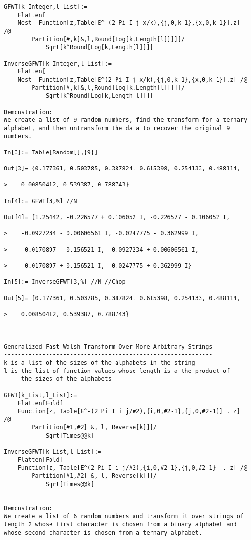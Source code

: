 \begin{verbatim}
GFWT[k_Integer,l_List]:=
	Flatten[
	Nest[ Function[z,Table[E^-(2 Pi I j x/k),{j,0,k-1},{x,0,k-1}].z] /@
		Partition[#,k]&,l,Round[Log[k,Length[l]]]]]/
			Sqrt[k^Round[Log[k,Length[l]]]]

InverseGFWT[k_Integer,l_List]:=
	Flatten[
	Nest[ Function[z,Table[E^(2 Pi I j x/k),{j,0,k-1},{x,0,k-1}].z] /@
		Partition[#,k]&,l,Round[Log[k,Length[l]]]]]/
			Sqrt[k^Round[Log[k,Length[l]]]]

Demonstration:
We create a list of 9 random numbers, find the transform for a ternary
alphabet, and then untransform the data to recover the original 9 numbers.

In[3]:= Table[Random[],{9}]

Out[3]= {0.177361, 0.503785, 0.387824, 0.615398, 0.254133, 0.488114, 
 
>    0.00850412, 0.539387, 0.788743}

In[4]:= GFWT[3,%] //N    

Out[4]= {1.25442, -0.226577 + 0.106052 I, -0.226577 - 0.106052 I, 
 
>    -0.0927234 - 0.00606561 I, -0.0247775 - 0.362999 I, 
 
>    -0.0170897 - 0.156521 I, -0.0927234 + 0.00606561 I, 
 
>    -0.0170897 + 0.156521 I, -0.0247775 + 0.362999 I}

In[5]:= InverseGFWT[3,%] //N //Chop

Out[5]= {0.177361, 0.503785, 0.387824, 0.615398, 0.254133, 0.488114, 
 
>    0.00850412, 0.539387, 0.788743}



Generalized Fast Walsh Transform Over More Arbitrary Strings
------------------------------------------------------------
k is a list of the sizes of the alphabets in the string
l is the list of function values whose length is a the product of 
     the sizes of the alphabets

GFWT[k_List,l_List]:=
	Flatten[Fold[
	Function[z, Table[E^-(2 Pi I i j/#2),{i,0,#2-1},{j,0,#2-1}] . z] /@
		Partition[#1,#2] &, l, Reverse[k]]]/
			Sqrt[Times@@k]

InverseGFWT[k_List,l_List]:=
	Flatten[Fold[
	Function[z, Table[E^(2 Pi I i j/#2),{i,0,#2-1},{j,0,#2-1}] . z] /@
		Partition[#1,#2] &, l, Reverse[k]]]/
			Sqrt[Times@@k]


Demonstration:
We create a list of 6 random numbers and transform it over strings of
length 2 whose first character is chosen from a binary alphabet and
whose second character is chosen from a ternary alphabet.


\end{verbatim}
